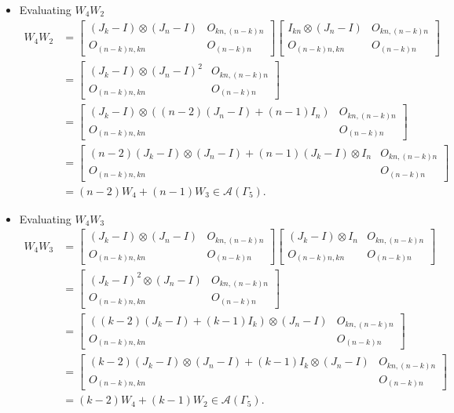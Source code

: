 \begin{itemize}
\item Evaluating $W_{4}W_{2}$
\begin{align*}
W_4W_2 &=
\begin{bmatrix}
(J_k - I) \otimes (J_n - I) & O_{kn, (n-k)n} \\
O_{(n-k)n,kn} & O_{(n-k)n}
\end{bmatrix}
\begin{bmatrix}
I_{kn} \otimes (J_n-I) & O_{kn, (n-k)n} \\
O_{(n-k)n,kn} & O_{(n-k)n}
\end{bmatrix}\\
&= \begin{bmatrix}
(J_k - I) \otimes (J_n - I)^2 & O_{kn, (n-k)n} \\
O_{(n-k)n,kn} & O_{(n-k)n}
\end{bmatrix}\\
&= \begin{bmatrix}
(J_k - I) \otimes ((n-2)(J_n - I) + (n-1)I_n) & O_{kn, (n-k)n} \\
O_{(n-k)n,kn} & O_{(n-k)n}
\end{bmatrix}\\
&= \begin{bmatrix}
(n-2)(J_k - I) \otimes (J_n - I) + (n-1)(J_k - I) \otimes I_n & O_{kn, (n-k)n} \\
O_{(n-k)n,kn} & O_{(n-k)n}
\end{bmatrix}\\
&= (n-2)W_4 + (n-1)W_3 \in\mathcal{A}(\Gamma_5).
\end{align*}

\item Evaluating $W_{4}W_{3}$
\begin{align*}
W_4W_3 &=
\begin{bmatrix}
(J_k - I) \otimes (J_n - I) & O_{kn, (n-k)n} \\
O_{(n-k)n,kn} & O_{(n-k)n}
\end{bmatrix}
\begin{bmatrix}
(J_k-I) \otimes I_n & O_{kn, (n-k)n} \\
O_{(n-k)n,kn} & O_{(n-k)n}
\end{bmatrix}\\
&= \begin{bmatrix}
(J_k - I)^2 \otimes (J_n - I) & O_{kn, (n-k)n} \\
O_{(n-k)n,kn} & O_{(n-k)n}
\end{bmatrix}\\
&= \begin{bmatrix}
((k-2)(J_k - I) + (k-1)I_k) \otimes (J_n - I) & O_{kn, (n-k)n} \\
O_{(n-k)n,kn} & O_{(n-k)n}
\end{bmatrix}\\
&= \begin{bmatrix}
(k-2)(J_k - I) \otimes (J_n - I) + (k-1)I_k\otimes(J_n-I) & O_{kn, (n-k)n} \\
O_{(n-k)n,kn} & O_{(n-k)n}
\end{bmatrix}\\
&= (k-2)W_4 + (k-1)W_2\in\mathcal{A}(\Gamma_5).
\end{align*}


\end{itemize}
